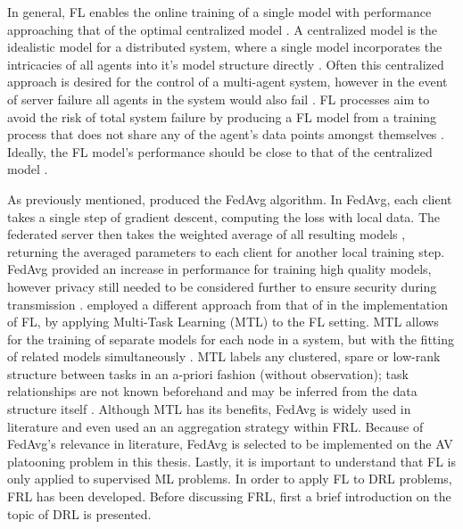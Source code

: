 In general, FL enables the online training of a single model with performance approaching
that of the optimal centralized model \cite{Yang2019a}. A centralized model is the
idealistic model for a distributed system, where a single model incorporates the intricacies
of all agents into it's model structure directly \cite{Yang2019a}.  Often this centralized
approach is desired for the control of a multi-agent system, however in the event of server
failure all agents in the system would also fail \cite{Long2018}.  FL processes aim to
avoid the risk of total system failure by producing a FL model from a training process
that does not share any of the agent's data points amongst themselves \cite{Yang2019a}.
Ideally, the FL  model's performance should be close to that of the centralized model
\cite{Yang2019a}.

As previously mentioned, \cite{BrendanMcMahan2017a} produced the FedAvg algorithm.  In
FedAvg, each client takes a single step of gradient descent, computing the loss with
local data. The federated server then takes the weighted average of all resulting models
\cite{BrendanMcMahan2017a}, returning the averaged parameters to each client for another
local training step.  FedAvg provided an increase in performance for training high
quality models, however privacy still needed to be considered further to ensure security
during transmission \cite{BrendanMcMahan2017a}. \cite{Smith2017} employed a different
approach from that of \cite{Yang2019a, BrendanMcMahan2017a} in the implementation of FL,
by applying Multi-Task Learning (MTL) to the FL setting.  MTL allows for the training of
separate models for each node in a system, but with the fitting of related models
simultaneously \cite{Smith2017}. MTL labels any clustered, spare or low-rank structure
between tasks in an a-priori fashion (without observation); task relationships are not
known beforehand and may be inferred from the data structure itself \cite{Smith2017}.
Although MTL has its benefits, FedAvg is widely used in literature and even used an an
aggregation strategy within FRL. Because of FedAvg's relevance in literature, FedAvg is
selected to be implemented on the AV platooning problem in this thesis. Lastly, it is
important to understand that FL is only applied to supervised ML problems.  In order to
apply FL to DRL problems, FRL has been developed. Before discussing FRL, first a brief
introduction on the topic of DRL is presented.

